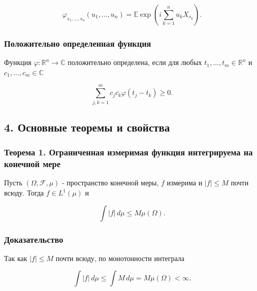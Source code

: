 \documentclass[
  11pt,
  a4paper,
]{article}
\begin{document}
\[
\varphi_{s_1,\ldots,s_n}(u_1,\ldots,u_n)
=
\mathbb E\exp\left(i\sum_{k=1}^n u_kX_{s_k}\right).
\]

\subsubsection{Положительно определенная
функция}\label{ux43fux43eux43bux43eux436ux438ux442ux435ux43bux44cux43dux43e-ux43eux43fux440ux435ux434ux435ux43bux435ux43dux43dux430ux44f-ux444ux443ux43dux43aux446ux438ux44f}

Функция \(\varphi:\mathbb R^n\to\mathbb C\) положительно определена,
если для любых \(t_1,\ldots,t_m\in\mathbb R^n\) и
\(c_1,\ldots,c_m\in\mathbb C\)

\[
\sum_{j,k=1}^m c_j\overline{c_k}\varphi(t_j-t_k)\ge0.
\]

\subsection{4. Основные теоремы и
свойства}\label{ux43eux441ux43dux43eux432ux43dux44bux435-ux442ux435ux43eux440ux435ux43cux44b-ux438-ux441ux432ux43eux439ux441ux442ux432ux430}

\subsubsection{Теорема 1. Ограниченная измеримая функция интегрируема на
конечной
мере}\label{ux442ux435ux43eux440ux435ux43cux430-1.-ux43eux433ux440ux430ux43dux438ux447ux435ux43dux43dux430ux44f-ux438ux437ux43cux435ux440ux438ux43cux430ux44f-ux444ux443ux43dux43aux446ux438ux44f-ux438ux43dux442ux435ux433ux440ux438ux440ux443ux435ux43cux430-ux43dux430-ux43aux43eux43dux435ux447ux43dux43eux439-ux43cux435ux440ux435}

Пусть \((\Omega,\mathcal F,\mu)\) - пространство конечной меры, \(f\)
измерима и \(|f|\le M\) почти всюду. Тогда \(f\in L^1(\mu)\) и

\[
\int |f|\,d\mu\le M\mu(\Omega).
\]

\subsubsection{Доказательство}\label{ux434ux43eux43aux430ux437ux430ux442ux435ux43bux44cux441ux442ux432ux43e}

Так как \(|f|\le M\) почти всюду, по монотонности интеграла

\[
\int |f|\,d\mu\le\int M\,d\mu=M\mu(\Omega)<\infty.
\]
\end{document}
